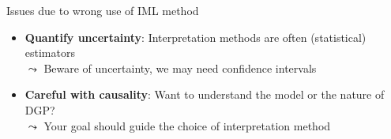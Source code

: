 \documentclass[11pt,compress,t,notes=noshow, aspectratio=169, xcolor=table]{beamer}
\begin{document}
\begin{frame}{Issues due to wrong use of IML method~}
    \begin{itemize}
        \item \textbf{Quantify uncertainty}: Interpretation methods are often (statistical) estimators \\
        $\leadsto$ Beware of uncertainty, we may need confidence intervals\\
        \item<3> \textbf{Careful with causality}:
        Want to understand the model or the nature of DGP?\\
        $\leadsto$ Your goal should guide the choice of interpretation method
    \end{itemize}
\end{frame}


\endlecture
\end{document}
